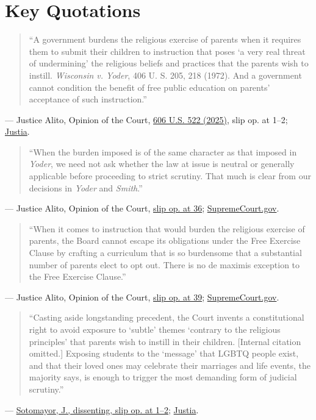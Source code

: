 \documentclass[12pt]{article}
\begin{document}
\section{Key Quotations}
\begin{quote}
``A government burdens the religious exercise of parents when it requires them to submit their children to instruction that poses `a very real threat of undermining' the religious beliefs and practices that the parents wish to instill. \textit{Wisconsin v. Yoder}, 406 U. S. 205, 218 (1972). And a government cannot condition the benefit of free public education on parents' acceptance of such instruction.''
\end{quote}
\noindent --- Justice Alito, Opinion of the Court, \href{https://www.law.cornell.edu/supremecourt/text/24-297}{606 U.S. 522 (2025)}, slip op. at 1--2; \href{https://supreme.justia.com/cases/federal/us/606/24-297/}{Justia}.

\begin{quote}
``When the burden imposed is of the same character as that imposed in \textit{Yoder}, we need not ask whether the law at issue is neutral or generally applicable before proceeding to strict scrutiny. That much is clear from our decisions in \textit{Yoder} and \textit{Smith}.''
\end{quote}
\noindent --- Justice Alito, Opinion of the Court, \href{https://www.law.cornell.edu/supremecourt/text/24-297}{slip op. at 36}; \href{https://www.supremecourt.gov/opinions/24pdf/24-297_4f14.pdf}{SupremeCourt.gov}.

\begin{quote}
``When it comes to instruction that would burden the religious exercise of parents, the Board cannot escape its obligations under the Free Exercise Clause by crafting a curriculum that is so burdensome that a substantial number of parents elect to opt out. There is no de maximis exception to the Free Exercise Clause.''
\end{quote}
\noindent --- Justice Alito, Opinion of the Court, \href{https://www.law.cornell.edu/supremecourt/text/24-297}{slip op. at 39}; \href{https://www.supremecourt.gov/opinions/24pdf/24-297_4f14.pdf}{SupremeCourt.gov}.

\begin{quote}
``Casting aside longstanding precedent, the Court invents a constitutional right to avoid exposure to `subtle' themes `contrary to the religious principles' that parents wish to instill in their children. [Internal citation omitted.] Exposing students to the `message' that LGBTQ people exist, and that their loved ones may celebrate their marriages and life events, the majority says, is enough to trigger the most demanding form of judicial scrutiny.''
\end{quote}
\noindent --- \href{https://www.law.cornell.edu/supremecourt/text/24-297}{Sotomayor, J., dissenting, slip op. at 1--2}; \href{https://supreme.justia.com/cases/federal/us/606/24-297/}{Justia}.
\end{document}
